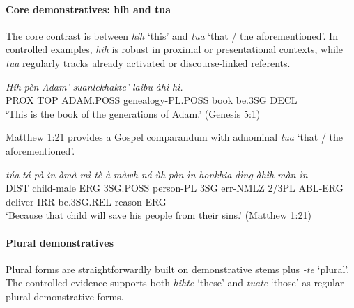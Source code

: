\documentclass[
  11pt,
  a4paper,
]{article}
\newcommand{\tdim}[1]{\textit{#1}}
\newcommand{\tdimword}[1]{\textit{#1}}
\renewcommand{\textsc}[1]{{\footnotesize\MakeUppercase{#1}}}
\newcommand{\glossquote}[1]{`#1'}
\begin{document}
\paragraph{Core demonstratives: hih and
tua}\label{core-demonstratives-hih-and-tua}

The core contrast is between \tdim{hih} \glossquote{this} and \tdim{tua}
\glossquote{that / the aforementioned}. In controlled examples,
\tdim{hih} is robust in proximal or presentational contexts, while
\tdim{tua} regularly tracks already activated or discourse-linked
referents.

\begin{exe}
\ex \label{ex:dem-hih}
\gll \tdimword{Híh} \tdimword{pèn} \tdimword{Adam'} \tdimword{suanlekhakte'} \tdimword{laibu} \tdimword{àhì} \tdimword{hì.} \\
     \textsc{prox} \textsc{top} \textsc{adam}.\textsc{poss} genealogy-\textsc{pl}.\textsc{poss} book be.\textsc{3sg} \textsc{decl} \\
\glt \glossquote{This is the book of the generations of Adam.} (Genesis 5:1)
\end{exe}

Matthew 1:21 provides a Gospel comparandum with adnominal \tdim{tua}
\glossquote{that / the aforementioned}.

\begin{exe}
\ex \label{ex:dem-tua}
\gll \tdimword{túa} \tdimword{tá-pà} \tdimword{ìn} \tdimword{àmà} \tdimword{mì-tè} \tdimword{à} \tdimword{màwh-ná} \tdimword{ùh} \tdimword{pàn-ìn} \tdimword{honkhia} \tdimword{dìng} \tdimword{àhìh} \tdimword{màn-ìn} \\
     \textsc{dist} child-male \textsc{erg} \textsc{3sg}.\textsc{poss} person-\textsc{pl} \textsc{3sg} err-\textsc{nmlz} 2/3PL \textsc{abl}-\textsc{erg} deliver \textsc{irr} be.\textsc{3sg}.\textsc{rel} reason-\textsc{erg} \\
\glt \glossquote{Because that child will save his people from their sins.} (Matthew 1:21)
\end{exe}

\paragraph{Plural demonstratives}\label{plural-demonstratives}

Plural forms are straightforwardly built on demonstrative stems plus
\tdim{-te} \glossquote{plural}. The controlled evidence supports both
\tdim{hihte} \glossquote{these} and \tdim{tuate} \glossquote{those} as
regular plural demonstrative forms.
\end{document}
